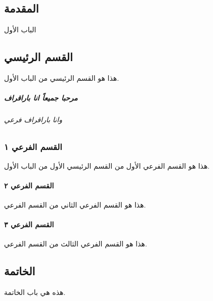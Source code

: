 \documentclass[a4paper,12pt]{book}
\begin{document}
\renewcommand{\contentsname}{المحتويات} %
\tableofcontents
	
	\begin{otherlanguage}{arabic}
		\chapter{المقدمة}
	الباب الأول
		
		\section{القسم الرئيسي}
		هذا هو القسم الرئيسي من الباب الأول.
		\paragraph{مرحبا جميعاً انا باراقراف}
		\subparagraph{وانا باراقراف فرعي}

		
		\subsection{القسم الفرعي ١}
		هذا هو القسم الفرعي الأول من القسم الرئيسي الأول من الباب الأول.
		
		\subsubsection{القسم الفرعي ٢}
		هذا هو القسم الفرعي الثاني من القسم الفرعي.
		
		\subsubsection{القسم الفرعي ٣}
		هذا هو القسم الفرعي الثالث من القسم الفرعي.
		
		\section{الخاتمة}
		هذه هي باب الخاتمة.
	\end{otherlanguage}
	
\end{document}
